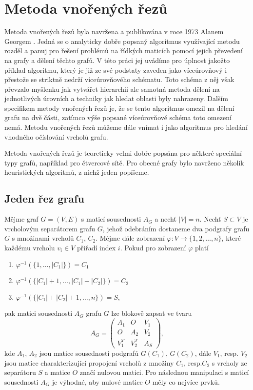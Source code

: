 \documentclass{ctuthesis}
\theoremstyle{plain}
\theoremstyle{definition}
\begin{document}
\section{Metoda vnořených řezů}

Metoda vnořených řezů byla navržena a publikována v roce 1973 Alanem Georgem \cite{geo:73}. Jedná se o analyticky dobře popsaný algoritmus využívající metodu rozděl a panuj pro řešení problémů na řídkých maticích pomocí jejich převedení na grafy a dělení těchto grafů. V této práci jej uvádíme pro úplnost jakožto příklad algoritmu, který je již ze své podstaty zaveden jako víceúrovňový i přestože se striktně nedrží víceúrovňového schématu. Toto schéma z něj však převzalo myšlenku jak vytvářet hierarchii ale samotná metoda dělení na jednotlivých úrovních a techniky jak hledat oblasti byly nahrazeny. Dalším specifikem metody vnořených řezů je, že se tento algoritmus omezil na dělení grafu na dvě části, zatímco výše popsané víceúrovňové schéma toto omezení nemá.
Metodu vnořených řezů můžeme dále vnímat i jako algoritmus pro hledání vhodného očíslování vrcholů grafu.

Metoda vnořených řezů je teoreticky velmi dobře popsána pro některé speciální typy grafů, například pro čtvercové sítě. Pro obecné grafy bylo navrženo několik heuristických algoritmů, z nichž jeden popíšeme.

\subsection{Jeden řez grafu}

Mějme graf $G = (V,E)$ s maticí sousednosti $A_G$ a nechť $|V| = n$. Nechť $S \subset V$ je vrcholovým separátorem grafu $G$, jehož odebráním dostaneme dva podgrafy grafu $G$ s množinami vrcholů $C_1$, $C_2$. Mějme dále zobrazení $\varphi: V \rightarrow \{1, 2, \ldots, n\}$, které každému vrcholu $v_i \in V$ přiřadí index $i$. Pokud pro zobrazení $\varphi$ platí
\begin{enumerate}
  \item $\varphi^{-1}\left(\{1,\ldots,|C_1|\} \right)=C_1$
  \item $\varphi^{-1}\left(\{|C_1|+1,\ldots,|C_1|+|C_2|\}\right)=C_2$
  \item $\varphi^{-1}\left(\{|C_1|+|C_2|+1,\ldots,n\}\right)=S$,
\end{enumerate}
pak matici sousednosti $A_G$ grafu $G$ lze blokově zapsat ve tvaru
\begin{equation}\label{AG nested}
    A_G =
    \left(
        \begin{matrix}
          A_1   & O     & V_1 \\
          O     & A_2   & V_2 \\
          V_1^T & V_2^T & A_S
        \end{matrix}
    \right),
\end{equation}
kde $A_1$, $A_2$ jsou matice sousednosti podgrafů $G(C_1)$, $G(C_2)$, dále $V_1$, resp. $V_2$ jsou matice charakterizující propojení vrcholů z množiny $C_1$, resp.$C_2$ s vrcholy ze separátoru $S$ a matice $O$ značí nulovou matici. Pro následnou manipulaci s maticí sousednosti $A_G$ je výhodné, aby nulové matice $O$ měly co nejvíce prvků.
\end{document}
